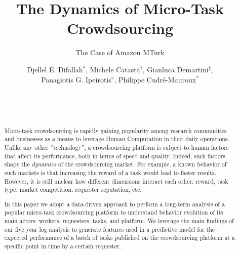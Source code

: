 \documentclass{sig-alternate}
\begin{document}
%

\title{The Dynamics of Micro-Task Crowdsourcing}
\subtitle{The Case of Amazon MTurk}


\author{
\alignauthor
Djellel E. Difallah$^*$, Michele Catasta$^\dagger$, Gianluca Demartini$^\ddagger$, \\  Panagiotis G. Ipeirotis$^\diamond$, Philippe Cudr\'e-Mauroux$^*$\\
       \\
       \\
       \\
}

\maketitle
\begin{abstract}
Micro-task crowdsourcing is rapidly gaining popularity among research communities and businesses as a means to leverage Human Computation in their daily operations. Unlike any other ``technology'', a crowdsourcing platform is subject to human factors that affect its performance, both in terms of speed and quality. Indeed, such factors shape the \emph{dynamics} of the crowdsourcing market. For example, a known behavior of such markets is that increasing the reward of a task would lead to faster results. However, it is still unclear how different dimensions interact each other: reward, task type, market competition, requester reputation, etc.

In this paper we adopt a data-driven approach to perform a long-term analysis of a popular micro-task crowdsourcing platform to understand behavior evolution of its main actors: workers, requesters, tasks, and platform. We leverage the main findings of our five year log analysis to generate features used in a predictive model for the expected performance of a batch of tasks published on the crowdsourcing platform at a specific point in time by a certain requester.
\end{abstract}
\end{document}
